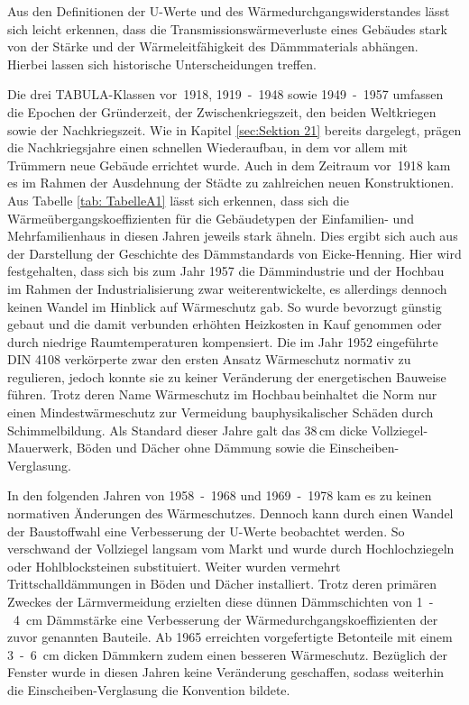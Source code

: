Aus den Definitionen der U-Werte und des Wärmedurchgangswiderstandes lässt sich leicht erkennen, dass die Transmissionswärmeverluste eines Gebäudes stark von der Stärke und der Wärmeleitfähigkeit des Dämmmaterials abhängen. 
Hierbei lassen sich historische Unterscheidungen treffen.

Die drei TABULA-Klassen \mbox{vor 1918}, \mbox{1919 - 1948} sowie \mbox{1949 - 1957} umfassen die Epochen der Gründerzeit, der Zwischenkriegszeit, den beiden Weltkriegen sowie der Nachkriegszeit. 
Wie in Kapitel \ref{sec:Sektion 21} bereits dargelegt, prägen die Nachkriegsjahre einen schnellen Wiederaufbau, in dem vor allem mit Trümmern neue Gebäude errichtet wurde. 
Auch in dem Zeitraum \mbox{vor 1918} kam es im Rahmen der Ausdehnung der Städte zu zahlreichen neuen Konstruktionen. 
Aus Tabelle \ref{tab: TabelleA1} lässt sich erkennen, dass sich die Wärmeübergangskoeffizienten für die Gebäudetypen der Einfamilien- und Mehrfamilienhaus in diesen Jahren jeweils stark ähneln. 
Dies ergibt sich auch aus der Darstellung der Geschichte des Dämmstandards von Eicke-Henning. 
Hier wird festgehalten, dass sich bis zum Jahr 1957 die Dämmindustrie und der Hochbau im Rahmen der Industrialisierung zwar weiterentwickelte, es allerdings dennoch keinen Wandel im Hinblick auf Wärmeschutz gab.
So wurde bevorzugt günstig gebaut und die damit verbunden erhöhten Heizkosten in Kauf genommen oder durch niedrige Raumtemperaturen kompensiert.
Die im Jahr 1952 eingeführte DIN 4108 verkörperte zwar den ersten Ansatz Wärmeschutz normativ zu regulieren, jedoch konnte sie zu keiner Veränderung der energetischen Bauweise führen. 
Trotz deren Name \glqq Wärmeschutz im Hochbau\grqq\,beinhaltet die Norm nur einen Mindestwärmeschutz zur Vermeidung bauphysikalischer Schäden durch Schimmelbildung.
Als Standard dieser Jahre galt das 38\,cm dicke Vollziegel-Mauerwerk, Böden und Dächer ohne Dämmung sowie die Einscheiben-Verglasung. \cite{EickeHenning.2011}

In den folgenden Jahren von \mbox{1958 - 1968} und \mbox{1969 - 1978} kam es zu keinen normativen Änderungen des Wärmeschutzes. 
Dennoch kann durch einen Wandel der Baustoffwahl eine Verbesserung der U-Werte beobachtet werden. 
So verschwand der Vollziegel langsam vom Markt und wurde durch Hochlochziegeln oder Hohlblocksteinen substituiert.
Weiter wurden vermehrt Trittschalldämmungen in Böden und Dächer installiert. 
Trotz deren primären Zweckes der Lärmvermeidung erzielten diese dünnen Dämmschichten von \mbox{1 - 4 cm} Dämmstärke eine Verbesserung der Wärmedurchgangskoeffizienten der zuvor genannten Bauteile.
Ab 1965 erreichten vorgefertigte Betonteile mit einem \mbox{3 - 6 cm} dicken Dämmkern zudem einen besseren Wärmeschutz.
Bezüglich der Fenster wurde in diesen Jahren keine Veränderung geschaffen, sodass weiterhin die Einscheiben-Verglasung die Konvention bildete. \cite{EickeHenning.2011}

